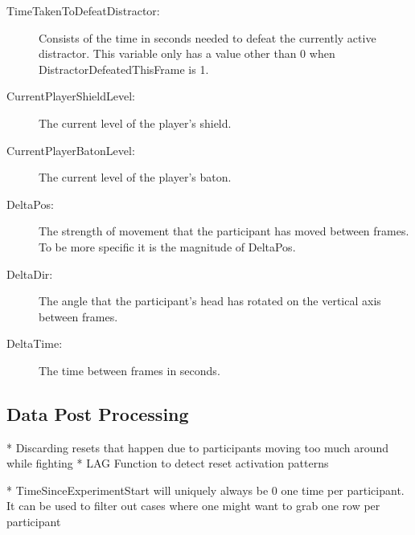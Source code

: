 \begin{description}
   \item[TimeTakenToDefeatDistractor:] Consists of the time in seconds needed to defeat the currently active distractor. This variable only has a value other than 0 when DistractorDefeatedThisFrame is 1. 
   \item[CurrentPlayerShieldLevel:] The current level of the player's shield. 
   \item[CurrentPlayerBatonLevel:] The current level of the player's baton. 
   \item[DeltaPos:] The strength of movement that the participant has moved between frames. To be more specific it is the magnitude of DeltaPos. 
   \item[DeltaDir:] The angle that the participant's head has rotated on the vertical axis between frames.
   \item[DeltaTime:] The time between frames in seconds.
\end{description}


\subsection{Data Post Processing}\label{sec:ex2postprocessingdetails}
  * Discarding resets that happen due to participants moving too much around while fighting
  * LAG Function to detect reset activation patterns
 
 * TimeSinceExperimentStart will uniquely always be 0 one time per participant. It can be used to filter out cases where one might want to grab one row per participant
